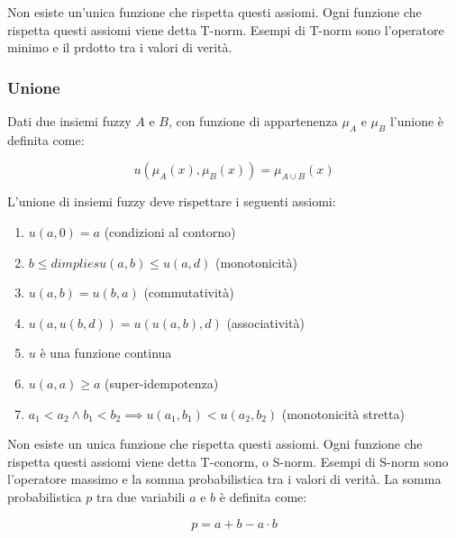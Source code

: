 Non esiste un'unica funzione che rispetta questi assiomi. Ogni funzione che rispetta questi assiomi viene detta T-norm.
Esempi di T-norm sono l'operatore minimo e il prdotto tra i valori di verità.

\subsubsection{Unione}

Dati due insiemi fuzzy $A$ e $B$, con funzione di appartenenza $\mu_A$ e $\mu_B$ l'unione è definita come:

\begin{equation*}
 u(\mu_A(x), \mu_B(x)) = \mu_{A\cup B}(x)
\end{equation*}

L'unione di insiemi fuzzy deve rispettare i seguenti assiomi:

\begin{enumerate}
 \item $u(a, 0)=a$ (condizioni al contorno)
 \item $b \leq d implies u(a,b) \leq u(a,d)$ (monotonicità)
 \item $u(a,b) = u(b,a)$ (commutatività)
 \item $u(a,u(b,d)) = u(u(a,b),d)$ (associatività)
 \item $u$ è una funzione continua
 \item $u(a,a) \geq a$ (super-idempotenza)
 \item $a_1< a_2 \wedge b_1 < b_2 \implies u(a_1,b_1)<u(a_2,b_2)$ (monotonicità stretta)
\end{enumerate}

Non esiste un unica funzione che rispetta questi assiomi. Ogni funzione che rispetta questi assiomi viene detta T-conorm, o S-norm.
Esempi di S-norm sono l'operatore massimo e la somma probabilistica tra i valori di verità.
La somma probabilistica $p$ tra due variabili $a$  e $b$ è definita come:

\begin{equation*}
 p = a+b - a\cdot b 
\end{equation*}




